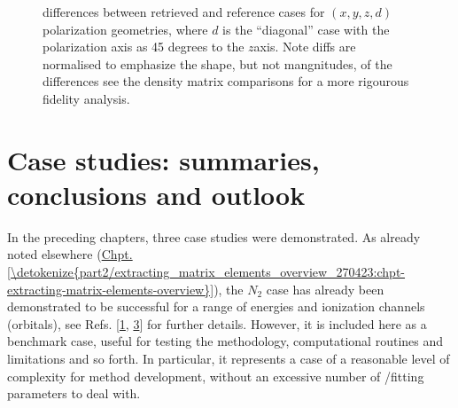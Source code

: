 \documentclass[letterpaper,table,10pt,english]{jupyterBook}
\begin{document}
\begin{figure}[htbp]
\centering
\capstart

\noindent{}
\caption{{\hyperref[\detokenize{backmatter/glossary:term-MF}]{}} differences between retrieved and reference cases for \((x,y,z,d)\) polarization geometries, where \(d\) is the “diagonal” case with the polarization axis as 45 degrees to the \(z\)\sphinxhyphen{}axis. Note diffs are normalised to emphasize the shape, but not mangnitudes, of the differences \sphinxhyphen{} see the density matrix comparisons for a more rigourous fidelity analysis.}\label{\detokenize{part2/case-study-C2H4_290723:fig-c2h4-diff}}\end{figure}

\sphinxstepscope


\chapter{Case studies: summaries, conclusions and outlook}
\label{\detokenize{part2/case-study-summaries_240723:case-studies-summaries-conclusions-and-outlook}}\label{\detokenize{part2/case-study-summaries_240723:chpt-case-study-summaries}}\label{\detokenize{part2/case-study-summaries_240723::doc}}
\sphinxAtStartPar
In the preceding chapters, three case studies were demonstrated. As already noted elsewhere (\hyperref[\detokenize{part2/extracting_matrix_elements_overview_270423:chpt-extracting-matrix-elements-overview}]{Chpt.\@ \ref{\detokenize{part2/extracting_matrix_elements_overview_270423:chpt-extracting-matrix-elements-overview}}}), the \(N_2\) case has already been demonstrated to be successful for a range of energies and ionization channels (orbitals), see Refs. {[}\hyperlink{cite.backmatter/bibliography:id775}{1}, \hyperlink{cite.backmatter/bibliography:id685}{3}{]} for further details. However, it is included here as a benchmark case, useful for testing the methodology, computational routines and limitations and so forth. In particular, it represents a case of a reasonable level of complexity for method development, without an excessive number of {\hyperref[\detokenize{backmatter/glossary:term-radial-matrix-elements}]{}}/fitting parameters to deal with.
\end{document}
